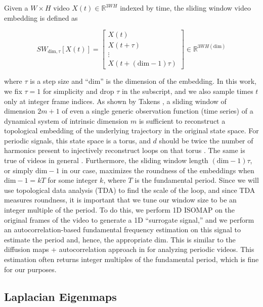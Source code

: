 \documentclass{article}
\begin{document}
Given a $W \times H$ video $X(t) \in \mathbb{R}^{3WH}$ indexed by time, the sliding window video embedding \cite{cao1998dynamics,traliehigh,tralie2017quasi} is defined as

\begin{equation}
SW_{\text{dim}, \tau}[X(t)] = \left[ \begin{array}{c} X(t) \\ X(t + \tau) \\ \vdots \\ X(t + (\text{dim}-1)\tau)  \end{array} \right] \in \mathbb{R}^{3WH(\text{dim})}
\end{equation}

where $\tau$ is a step size and ``dim'' is the dimension of the embedding.  In this work, we fix $\tau = 1$ for simplicity and drop $\tau$ in the subscript, and we also sample times $t$ only at integer frame indices.  As shown by Takens \cite{takens1981detecting}, a sliding window of dimension $2m+1$ of even a single generic observation function (time series) of a dynamical system of intrinsic dimension $m$ is sufficient to reconstruct a topological embedding of the underlying trajectory in the original state space.  For periodic signals, this state space is a torus, and $d$ should be twice the number of harmonics present to injectively reconstruct loops on that torus \cite{perea2015sliding}.  The same is true of videos in general \cite{tralie2017quasi}.  Furthermore, the sliding window length $(\text{dim}-1) \tau$, or simply $\text{dim}-1$ in our case, maximizes the roundness of the embeddings when $\text{dim}-1 = k T$ for some integer $k$, where $T$ is the fundamental period.  Since we will use topological data analysis (TDA) to find the scale of the loop, and since TDA measures roundness, it is important that we tune our window size to be an integer multiple of the period.  To do this, we perform 1D ISOMAP \cite{tenenbaum2000global} on the original frames of the video to generate a 1D ``surrogate signal,'' and we perform an autocorrelation-based fundamental frequency estimation \cite{Mcleod05asmarter} on this signal to estimate the period and, hence, the appropriate dim.  This is similar to the diffusion maps + autocorrelation approach in \cite{tralie2017quasi} for analyzing periodic videos.  This estimation often returns integer multiples of the fundamental period, which is fine for our purposes.

\subsection{Laplacian Eigenmaps}
\label{sec:laplacian}
\end{document}
